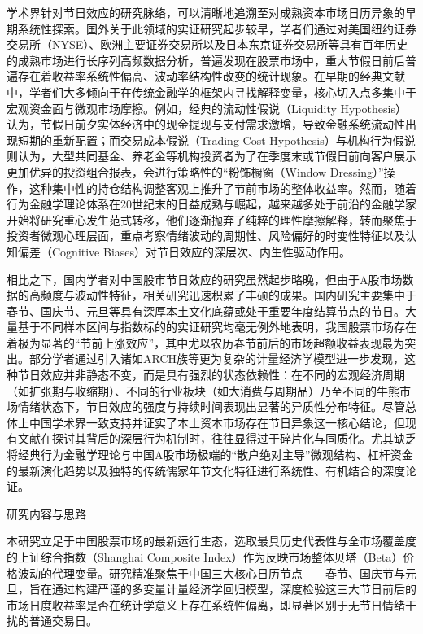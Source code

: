 \documentclass{cupb-thesis}
\begin{document}
学术界针对节日效应的研究脉络，可以清晰地追溯至对成熟资本市场日历异象的早期系统性探索。国外关于此领域的实证研究起步较早，学者们通过对美国纽约证券交易所（NYSE）、欧洲主要证券交易所以及日本东京证券交易所等具有百年历史的成熟市场进行长序列高频数据分析，普遍发现在股票市场中，重大节假日前后普遍存在着收益率系统性偏高、波动率结构性改变的统计现象。在早期的经典文献中，学者们大多倾向于在传统金融学的框架内寻找解释变量，核心切入点多集中于宏观资金面与微观市场摩擦。例如，经典的流动性假说（Liquidity Hypothesis）认为，节假日前夕实体经济中的现金提现与支付需求激增，导致金融系统流动性出现短期的重新配置；而交易成本假说（Trading Cost Hypothesis）与机构行为假说则认为，大型共同基金、养老金等机构投资者为了在季度末或节假日前向客户展示更加优异的投资组合报表，会进行策略性的“粉饰橱窗（Window Dressing）”操作，这种集中性的持仓结构调整客观上推升了节前市场的整体收益率。然而，随着行为金融学理论体系在20世纪末的日益成熟与崛起，越来越多处于前沿的金融学家开始将研究重心发生范式转移，他们逐渐抛弃了纯粹的理性摩擦解释，转而聚焦于投资者微观心理层面，重点考察情绪波动的周期性、风险偏好的时变性特征以及认知偏差（Cognitive Biases）对节日效应的深层次、内生性驱动作用。


相比之下，国内学者对中国股市节日效应的研究虽然起步略晚，但由于A股市场数据的高频度与波动性特征，相关研究迅速积累了丰硕的成果。国内研究主要集中于春节、国庆节、元旦等具有深厚本土文化底蕴或处于重要年度结算节点的节日。大量基于不同样本区间与指数标的的实证研究均毫无例外地表明，我国股票市场存在着极为显著的“节前上涨效应”，其中尤以农历春节前后的市场超额收益表现最为突出。部分学者通过引入诸如ARCH族等更为复杂的计量经济学模型进一步发现，这种节日效应并非静态不变，而是具有强烈的状态依赖性：在不同的宏观经济周期（如扩张期与收缩期）、不同的行业板块（如大消费与周期品）乃至不同的牛熊市场情绪状态下，节日效应的强度与持续时间表现出显著的异质性分布特征。尽管总体上中国学术界一致支持并证实了本土资本市场存在节日异象这一核心结论，但现有文献在探讨其背后的深层行为机制时，往往显得过于碎片化与同质化。尤其缺乏将经典行为金融学理论与中国A股市场极端的“散户绝对主导”微观结构、杠杆资金的最新演化趋势以及独特的传统儒家年节文化特征进行系统性、有机结合的深度论证。


研究内容与思路

本研究立足于中国股票市场的最新运行生态，选取最具历史代表性与全市场覆盖度的上证综合指数（Shanghai Composite Index）作为反映市场整体贝塔（Beta）价格波动的代理变量。研究精准聚焦于中国三大核心日历节点——春节、国庆节与元旦，旨在通过构建严谨的多变量计量经济学回归模型，深度检验这三大节日前后的市场日度收益率是否在统计学意义上存在系统性偏离，即显著区别于无节日情绪干扰的普通交易日。
\end{document}
